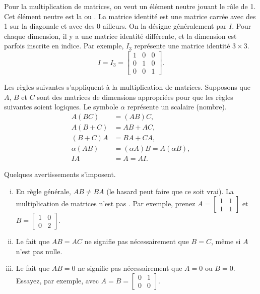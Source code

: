 \medskip

Pour la multiplication de matrices, on veut un élément neutre jouant le rôle de 1. Cet élément neutre est la \emph{} ou \emph{}.
La matrice identité est une matrice carrée avec des 1 sur la diagonale et avec des 0 ailleurs. On la désigne généralement par $I$.
Pour chaque dimension, il y a une matrice identité différente, et la dimension est parfois inscrite en indice. Par exemple, $I_3$ représente une matrice identité $3 \times 3$.
\begin{equation*}
I = I_3 =
\begin{bmatrix}
1 & 0 & 0 \\
0 & 1 & 0 \\
0 & 0 & 1
\end{bmatrix} .
\end{equation*}

Les règles suivantes s'appliquent à la multiplication de matrices. Supposons que
$A$, $B$ et $C$ sont des matrices de dimensions appropriées pour que les règles suivantes soient logiques. Le symbole $\alpha$ représente un scalaire (nombre).
\begin{align*}
A(BC) & = (AB)C, \\
A(B+C) & = AB + AC, \\
(B+C)A & = BA + CA, \\
\alpha(AB) & = (\alpha A)B = A(\alpha B), \\
IA & = A = AI .
\end{align*}

\pagebreak[2]
Quelques avertissements s'imposent.
\begin{enumerate}[(i)]
\item En règle générale, $AB \not= BA$ (le hasard peut faire que ce soit vrai). La multiplication de matrices n'est pas . Par exemple, prenez
$A = \left[ \begin{smallmatrix} 1 & 1 \\ 1 & 1 \end{smallmatrix} \right]$
et
$B = \left[ \begin{smallmatrix} 1 & 0 \\ 0 & 2 \end{smallmatrix} \right]$.
\item Le fait que $AB = AC$ ne signifie pas nécessairement que $B=C$, même si $A$ n'est pas nulle.
\item Le fait que $AB = 0$ ne signifie pas nécessairement que $A=0$ ou $B=0$.
Essayez, par exemple, avec
$A = B = \left[ \begin{smallmatrix} 0 & 1 \\ 0 & 0 \end{smallmatrix}
\right]$.
\end{enumerate}

